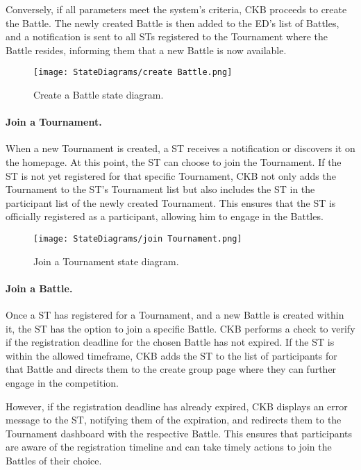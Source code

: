 Conversely, if all parameters meet the system's criteria, CKB proceeds to create the Battle. The newly created Battle is then added to the ED's list of Battles, and a notification is sent to all STs registered to the Tournament where the Battle resides, informing them that a new Battle is now available.

\begin{figure}[H]
    \begin{center}
        \texttt{[image: StateDiagrams/create Battle.png]}
        \caption{Create a Battle state diagram.}
        \label{fig:create_Battle_sd}%
    \end{center}
\end{figure}

\paragraph{Join a Tournament.}
When a new Tournament is created, a ST receives a notification or discovers it on the homepage. At this point, the ST can choose to join the Tournament. If the ST is not yet registered for that specific Tournament, CKB not only adds the Tournament to the ST's Tournament list but also includes the ST in the participant list of the newly created Tournament. This ensures that the ST is officially registered as a participant, allowing him to engage in the Battles.

\begin{figure}[H]
    \begin{center}
        \texttt{[image: StateDiagrams/join Tournament.png]}
        \caption{Join a Tournament state diagram.}
        \label{fig:join_Tournament_sd}%
    \end{center}
\end{figure}

\paragraph{Join a Battle.}
Once a ST has registered for a Tournament, and a new Battle is created within it, the ST has the option to join a specific Battle. CKB performs a check to verify if the registration deadline for the chosen Battle has not expired. If the ST is within the allowed timeframe, CKB adds the ST to the list of participants for that Battle and directs them to the create group page where they can further engage in the competition.

However, if the registration deadline has already expired, CKB displays an error message to the ST, notifying them of the expiration, and redirects them to the Tournament dashboard with the respective Battle. This ensures that participants are aware of the registration timeline and can take timely actions to join the Battles of their choice.

